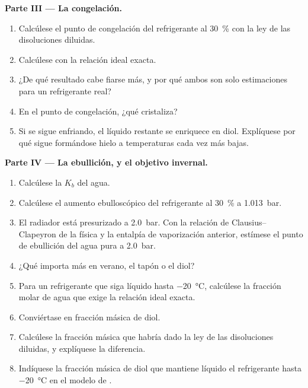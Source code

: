 \begin{problem}
\medskip
\noindent\textbf{Parte III --- La congelación.}
\begin{enumerate}[resume]
  \item Calcúlese el punto de congelación del refrigerante al \qty{30}{\percent} con la
        ley de las disoluciones diluidas.
  \item Calcúlese con la relación ideal exacta.
  \item ¿De qué resultado cabe fiarse más, y por qué ambos son solo estimaciones para un
        refrigerante real?
  \item En el punto de congelación, ¿qué cristaliza?
  \item Si se sigue enfriando, el líquido restante se enriquece en diol. Explíquese
        por qué sigue formándose hielo a temperaturas cada vez más bajas.
\end{enumerate}

\medskip
\noindent\textbf{Parte IV --- La ebullición, y el objetivo invernal.}
\begin{enumerate}[resume]
  \item Calcúlese la $K_b$ del agua.
  \item Calcúlese el aumento ebulloscópico del refrigerante al \qty{30}{\percent}
        a \qty{1.013}{bar}.
  \item El radiador está presurizado a \qty{2.0}{bar}. Con la
        relación de Clausius--Clapeyron de la física y la entalpía de
        vaporización anterior, estímese el punto de ebullición del agua pura a
        \qty{2.0}{bar}.
  \item ¿Qué importa más en verano, el tapón o el diol?
  \item Para un refrigerante que siga líquido hasta \qty{-20}{\celsius}, calcúlese la fracción
        molar de agua que exige la relación ideal exacta.
  \item Conviértase en fracción másica de diol.
  \item Calcúlese la fracción másica que habría dado la ley de las disoluciones diluidas, y
        explíquese la diferencia.
  \item Indíquese la fracción másica de diol que mantiene líquido el refrigerante hasta
        \qty{-20}{\celsius} en el modelo de .
\end{enumerate}
\end{problem}
